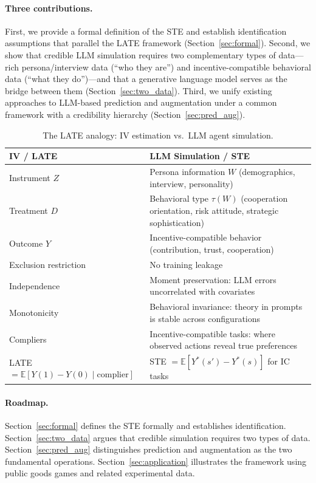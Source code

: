 \documentclass[12pt]{article}
\newcommand{\E}{\mathbb{E}}
\begin{document}
\paragraph{Three contributions.}
First, we provide a formal definition of the STE and establish identification assumptions that parallel the LATE framework (Section~\ref{sec:formal}). Second, we show that credible LLM simulation requires two complementary types of data---rich persona/interview data (``who they are'') and incentive-compatible behavioral data (``what they do'')---and that a generative language model serves as the bridge between them (Section~\ref{sec:two_data}). Third, we unify existing approaches to LLM-based prediction \citep{manning2026general} and augmentation \citep{broska2025mixed, ludwig2025large} under a common framework with a credibility hierarchy (Section~\ref{sec:pred_aug}).

\begin{table}[h!]
\centering
\small
\caption{The LATE analogy: IV estimation vs.\ LLM agent simulation.}
\label{tab:late_parallel}
\begin{tabular}{@{}p{5.5cm}p{7.5cm}@{}}
\toprule
\textbf{IV / LATE} & \textbf{LLM Simulation / STE} \\
\midrule
Instrument $Z$ & Persona information $W$ (demographics, interview, personality) \\
Treatment $D$ & Behavioral type $\tau(W)$ (cooperation orientation, risk attitude, strategic sophistication) \\
Outcome $Y$ & Incentive-compatible behavior (contribution, trust, cooperation) \\
Exclusion restriction & No training leakage \citep{ludwig2025large} \\
Independence & Moment preservation: LLM errors uncorrelated with covariates \\
Monotonicity & Behavioral invariance: theory in prompts is stable across configurations \citep{manning2026general} \\
Compliers & Incentive-compatible tasks: where observed actions reveal true preferences \\
LATE $= \E[Y(1) - Y(0) \mid \text{complier}]$ & STE $= \E[Y^*(s') - Y^*(s)]$ for IC tasks \\
\bottomrule
\end{tabular}
\end{table}

\paragraph{Roadmap.}
Section~\ref{sec:formal} defines the STE formally and establishes identification. Section~\ref{sec:two_data} argues that credible simulation requires two types of data. Section~\ref{sec:pred_aug} distinguishes prediction and augmentation as the two fundamental operations. Section~\ref{sec:application} illustrates the framework using public goods games and related experimental data.
\end{document}

